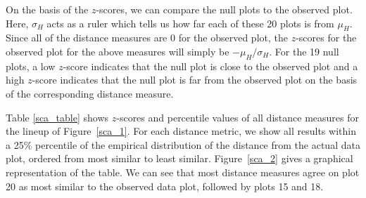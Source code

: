 

On the basis of the $z$-scores, we can compare the null plots to the observed plot. Here, $\sigma_H$ acts as a ruler which tells us how far each of these 20 plots is from $\mu_H$. Since all of the distance measures are 0 %
for the observed plot, the $z$-scores for the observed plot for the above measures will simply be $-\mu_H/\sigma_H$. For the 19 null plots, a low $z$-score indicates that the null plot is close to the observed plot and a high $z$-score indicates that the null plot is far from the observed plot on the basis of the corresponding distance measure. 

Table \ref{sca_table} shows $z$-scores and percentile values of all distance measures for the lineup of Figure~\ref{sca_1}. %
For each distance metric, we show all results within a 25\% percentile of the empirical distribution of the distance from the actual data plot, ordered from most similar to least similar. 
Figure~\ref{sca_2} gives a graphical representation of the table. We can see that most distance measures agree on plot 20 as most similar  to the observed data plot, followed by plots 15 and 18.


